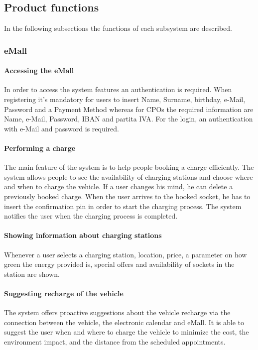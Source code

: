 \subsection{Product functions}
In the following subsections the functions of each subsystem are described.

\subsubsection{\acf{eMall}}
\paragraph{Accessing the \ac{eMall}}
In order to access the system features an authentication is required. When registering it's mandatory for users to insert Name, Surname, birthday, e-Mail, Password and a Payment Method whereas for \acp{CPO} the required information are Name, e-Mail, Password, \ac{IBAN} and \gls{partita IVA}. For the login, an authentication with e-Mail and password is required.

\paragraph{Performing a charge}
The main feature of the system is to help people booking a charge efficiently. The system allows people to see the availability of charging stations and choose where and when to charge the vehicle.
If a user changes his mind, he can delete a previously booked charge.
When the user arrives to the booked socket, he has to insert the confirmation pin in order to start the charging process.
The system notifies the user when the charging process is completed.

\paragraph{Showing information about charging stations}
Whenever a user selects a charging station, location, price, a parameter on how green the energy provided is, special offers and availability of sockets in the station are shown.

\paragraph{Suggesting recharge of the vehicle}
The system offers proactive suggestions about the vehicle recharge via the connection between the vehicle, the electronic calendar and \ac{eMall}. It is able to suggest the user when and where to charge the vehicle to minimize the cost, the environment impact, and the distance from the scheduled appointments.

